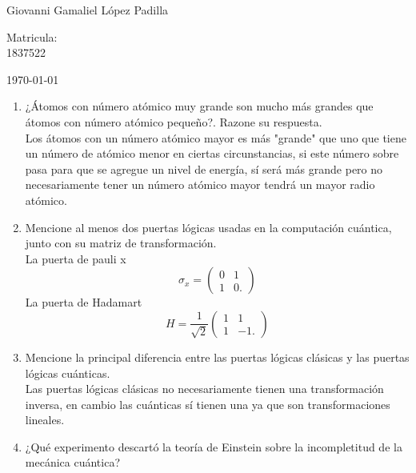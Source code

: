 \documentclass[12pt,letterpaper]{report}
\begin{document}
\begin{titlepage}
\begin{center}
\begin{minipage}{0.6\linewidth}
Giovanni Gamaliel López Padilla
\end{minipage}
\begin{minipage}{0.2\linewidth}
\changefontsizes{14pt} 
Matricula:\\                                                                                                                        
1837522
\end{minipage}
\end{center}
\vspace{4cm}
\begin{flushright}
\today
\end{flushright}
\end{titlepage}
\begin{enumerate}
    \item ¿Átomos con número atómico muy grande son mucho más grandes que átomos con número atómico pequeño?. Razone su respuesta.\\
    Los átomos con un número atómico mayor es más "grande" que uno que tiene un número de atómico menor en ciertas circunstancias, si este número sobre pasa para que se agregue un nivel de energía, sí será más grande pero no necesariamente tener un número atómico mayor tendrá un mayor radio atómico.
    \item Mencione al menos dos puertas lógicas usadas en la computación cuántica, junto con su matriz de transformación.\\
    La puerta de pauli x \begin{equation*}
        \sigma_x=\left(\begin{matrix}
            0 & 1 \\
            1 & 0.
        \end{matrix}\right) 
    \end{equation*}
    La puerta de Hadamart \begin{equation*}
        H= \frac{1}{\sqrt{2}}
        \left(\begin{matrix}
        1 & 1 \\ 1 & -1.
        \end{matrix}\right)
    \end{equation*}
    \item Mencione la principal diferencia entre las puertas lógicas clásicas y las puertas lógicas cuánticas.\\
    Las puertas lógicas clásicas no necesariamente tienen una transformación inversa, en cambio las cuánticas sí tienen una ya que son transformaciones lineales.
    \item ¿Qué experimento descartó la teoría de Einstein sobre la incompletitud de la mecánica cuántica?\\

\end{enumerate}
\end{document}
